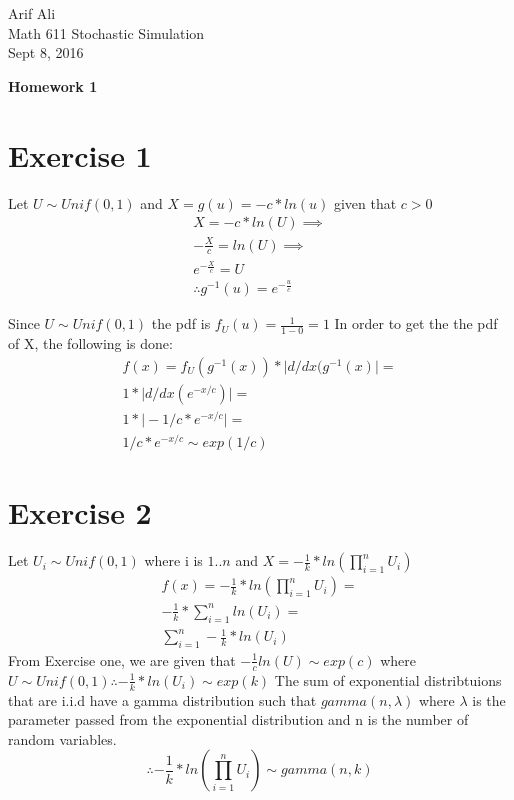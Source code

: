 \documentclass{article}\usepackage[]{graphicx}\usepackage[]{color}
\begin{document}
\begin{flushright}
Arif Ali\\
Math 611 Stochastic Simulation\\
Sept 8, 2016\\
\end{flushright}

\begin{center}
\LARGE\textbf{Homework 1}
  \end{center}
\section*{Exercise 1}
Let $U \sim Unif(0,1)$ and $X = g(u) = -c*ln(u)$ given that $c>0$
\begin{equation}
\begin{split}
X = -c*ln(U) \implies \\
-\frac{X}{c} = ln(U) \implies \\
e^{-\frac{X}{c}} = U \\
\therefore g^{-1}(u) = e^{-\frac{u}{c}}
\end{split}
\end{equation}

Since $U \sim Unif(0,1)$ the pdf is $f_U(u) = \frac{1}{1-0}=1$
In order to get the the pdf of X, the following is done:
\begin{equation}
\begin{split}
f(x)= f_U(g^{-1}(x))*\big|d/dx(g^{-1}(x)\big| = \\
1*\big|d/dx(e^{-x/c})\big| = \\
1*\big|-1/c*e^{-x/c}\big| =\\
1/c*e^{-x/c}\sim exp(1/c)
\end{split}
\end{equation}


\section*{Exercise 2}
Let $U_{i} \sim Unif(0,1)$ where i is $1..n$ and $X=-\frac{1}{k}*ln(\prod^{n}_{i=1}U_{i})$
\begin{equation}
\begin{split}
f(x)=-\frac{1}{k}*ln(\prod^{n}_{i=1}U_{i}) = \\
-\frac{1}{k}*\sum^{n}_{i=1}ln(U_{i}) = \\
\sum^{n}_{i=1}-\frac{1}{k}*ln(U_{i})
\end{split}
\end{equation}
From Exercise one, we are given that $-\frac{1}{c}ln(U) \sim exp(c)$ where $U \sim Unif(0,1) \therefore -\frac{1}{k}*ln(U_{i}) \sim exp(k)$
The sum of exponential distribtuions that are i.i.d have a gamma distribution such that $gamma(n,\lambda)$ where $\lambda$ is the parameter passed from the exponential distribution and n is the number of random variables.
\begin{equation}
\therefore -\frac{1}{k}*ln(\prod^{n}_{i=1}U_{i}) \sim gamma(n,k)
\end{equation}
\end{document}
